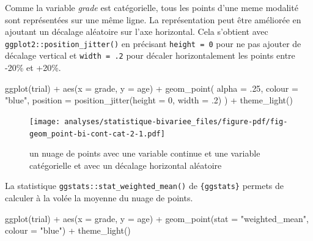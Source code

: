 \documentclass[
  letterpaper,
  DIV=11,
  numbers=noendperiod,
  oneside]{scrreprt}
\newenvironment{Shaded}{\begin{snugshade}}{\end{snugshade}}
\newcommand{\AttributeTok}[1]{\textcolor[rgb]{0.40,0.45,0.13}{#1}}
\newcommand{\DecValTok}[1]{\textcolor[rgb]{0.68,0.00,0.00}{#1}}
\newcommand{\FunctionTok}[1]{\textcolor[rgb]{0.28,0.35,0.67}{#1}}
\newcommand{\NormalTok}[1]{\textcolor[rgb]{0.00,0.23,0.31}{#1}}
\newcommand{\SpecialCharTok}[1]{\textcolor[rgb]{0.37,0.37,0.37}{#1}}
\newcommand{\StringTok}[1]{\textcolor[rgb]{0.13,0.47,0.30}{#1}}
\begin{document}
Comme la variable \emph{grade} est catégorielle, tous les points d'une
meme modalité sont représentées sur une même ligne. La représentation
peut être améliorée en ajoutant un décalage aléatoire sur l'axe
horizontal. Cela s'obtient avec \texttt{ggplot2::position\_jitter()} en
précisant \texttt{height\ =\ 0} pour ne pas ajouter de décalage vertical
et \texttt{width\ =\ .2} pour décaler horizontalement les points entre
-20\% et +20\%.

\begin{Shaded}
\begin{Highlighting}[]
\FunctionTok{ggplot}\NormalTok{(trial) }\SpecialCharTok{+}
  \FunctionTok{aes}\NormalTok{(}\AttributeTok{x =}\NormalTok{ grade, }\AttributeTok{y =}\NormalTok{ age) }\SpecialCharTok{+}
  \FunctionTok{geom\_point}\NormalTok{(}
    \AttributeTok{alpha =}\NormalTok{ .}\DecValTok{25}\NormalTok{,}
    \AttributeTok{colour =} \StringTok{"blue"}\NormalTok{,}
    \AttributeTok{position =} \FunctionTok{position\_jitter}\NormalTok{(}\AttributeTok{height =} \DecValTok{0}\NormalTok{, }\AttributeTok{width =}\NormalTok{ .}\DecValTok{2}\NormalTok{)}
\NormalTok{  ) }\SpecialCharTok{+}
  \FunctionTok{theme\_light}\NormalTok{()}
\end{Highlighting}
\end{Shaded}

\begin{figure}[H]

{\centering \texttt{[image: analyses/statistique-bivariee\_files/figure-pdf/fig-geom\_point-bi-cont-cat-2-1.pdf]}

}

\caption{\label{fig-geom_point-bi-cont-cat-2}un nuage de points avec une
variable continue et une variable catégorielle et avec un décalage
horizontal aléatoire}

\end{figure}

La statistique \texttt{ggstats::stat\_weighted\_mean()} de
\texttt{\{ggstats\}} permets de calculer à la volée la moyenne du nuage
de points.

\begin{Shaded}
\begin{Highlighting}[]
\FunctionTok{ggplot}\NormalTok{(trial) }\SpecialCharTok{+}
  \FunctionTok{aes}\NormalTok{(}\AttributeTok{x =}\NormalTok{ grade, }\AttributeTok{y =}\NormalTok{ age) }\SpecialCharTok{+}
  \FunctionTok{geom\_point}\NormalTok{(}\AttributeTok{stat =} \StringTok{"weighted\_mean"}\NormalTok{, }\AttributeTok{colour =} \StringTok{"blue"}\NormalTok{) }\SpecialCharTok{+}
  \FunctionTok{theme\_light}\NormalTok{()}
\end{Highlighting}
\end{Shaded}
\end{document}
